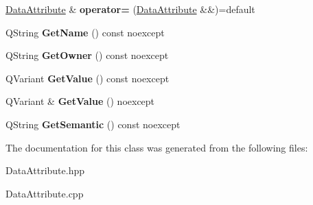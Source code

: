 \begin{DoxyCompactItemize}
\hyperlink{classUPIM_1_1DATA_1_1DataAttribute}{Data\+Attribute} \& {\bfseries operator=} (\hyperlink{classUPIM_1_1DATA_1_1DataAttribute}{Data\+Attribute} \&\&)=default
\item 
\mbox{\label{classUPIM_1_1DATA_1_1DataAttribute_a7caa09a9576f050b26b3b8cb820b09a5}} 
Q\+String {\bfseries Get\+Name} () const noexcept
\item 
\mbox{\label{classUPIM_1_1DATA_1_1DataAttribute_a3d46a63a6284c2b2960c2894ec1c6bbc}} 
Q\+String {\bfseries Get\+Owner} () const noexcept
\item 
\mbox{\label{classUPIM_1_1DATA_1_1DataAttribute_a2f4e5815a664083f00232ed48e085615}} 
Q\+Variant {\bfseries Get\+Value} () const noexcept
\item 
\mbox{\label{classUPIM_1_1DATA_1_1DataAttribute_a8de33ce86517780af469eba914268ae6}} 
Q\+Variant \& {\bfseries Get\+Value} () noexcept
\item 
\mbox{\label{classUPIM_1_1DATA_1_1DataAttribute_aee938e046128f7f56909eaa3b86ea3f9}} 
Q\+String {\bfseries Get\+Semantic} () const noexcept
\end{DoxyCompactItemize}


The documentation for this class was generated from the following files\+:\begin{DoxyCompactItemize}
\item 
Data\+Attribute.\+hpp\item 
Data\+Attribute.\+cpp\end{DoxyCompactItemize}
